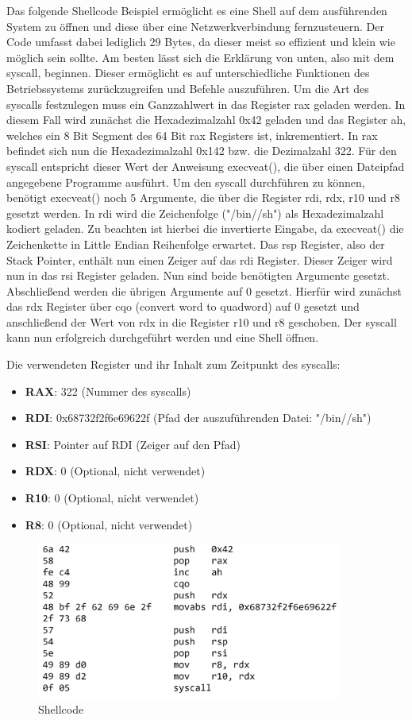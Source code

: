 Das folgende Shellcode Beispiel ermöglicht es eine Shell auf dem ausführenden System zu öffnen und diese über eine Netzwerkverbindung fernzusteuern. 
Der Code umfasst dabei lediglich 29 Bytes, da dieser meist so effizient und klein wie möglich sein sollte. 
Am besten lässt sich die Erklärung von unten, also mit dem syscall, beginnen. 
Dieser ermöglicht es auf unterschiedliche Funktionen des Betriebssystems zurückzugreifen und Befehle auszuführen. 
Um die Art des syscalls festzulegen muss ein Ganzzahlwert in das Register rax geladen werden. 
In diesem Fall wird zunächst die Hexadezimalzahl 0x42 geladen und das Register ah, welches ein 8 Bit Segment des 64 Bit rax Registers ist, inkrementiert. 
In rax befindet sich nun die Hexadezimalzahl 0x142 bzw. die Dezimalzahl 322. Für den syscall entspricht dieser Wert der Anweisung execveat(), 
die über einen Dateipfad angegebene Programme ausführt. Um den syscall durchführen zu können, benötigt execveat() noch 5 Argumente, 
die über die Register rdi, rdx, r10 und r8 gesetzt werden. In rdi wird die Zeichenfolge ("/bin//sh") als Hexadezimalzahl kodiert geladen. 
Zu beachten ist hierbei die invertierte Eingabe, da execveat() die Zeichenkette in Little Endian Reihenfolge erwartet. Das rsp Register, also der Stack Pointer, 
enthält nun einen Zeiger auf das rdi Register. Dieser Zeiger wird nun in das rsi Register geladen. Nun sind beide benötigten Argumente gesetzt. 
Abschließend werden die übrigen Argumente auf 0 gesetzt. Hierfür wird zunächst das rdx Register über cqo (convert word to quadword) auf 0 gesetzt und
anschließend der Wert von rdx in die Register r10 und r8 geschoben. Der syscall kann nun erfolgreich durchgeführt werden und eine Shell öffnen.

Die verwendeten Register und ihr Inhalt zum Zeitpunkt des syscalls:

\begin{itemize}
    \item \textbf{RAX}: 322 (Nummer des syscalls)
    \item \textbf{RDI}: 0x68732f2f6e69622f (Pfad der auszuführenden Datei: "/bin//sh")
    \item \textbf{RSI}: Pointer auf RDI (Zeiger auf den Pfad)
    \item \textbf{RDX}: 0 (Optional, nicht verwendet)
    \item \textbf{R10}: 0 (Optional, nicht verwendet)
    \item \textbf{R8}:  0 (Optional, nicht verwendet)
\end{itemize}

\begin{figure}[h]
    \centering
    \includegraphics[width=0.9\textwidth,height=0.75\textheight,keepaspectratio]{images/shellstorm.png}
    \caption{Shellcode}
\end{figure}
\cite{shellstorm}

